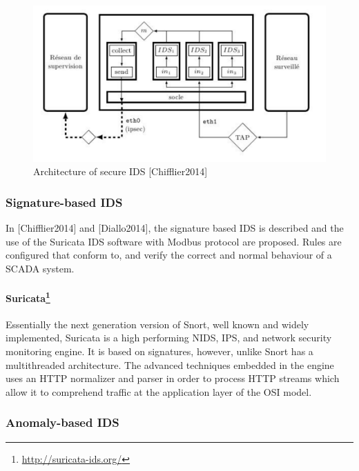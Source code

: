 \documentclass[12pt,]{article}
\let\rmarkdownfootnote\footnote%
\def\footnote{\protect\rmarkdownfootnote}
\begin{document}
\begin{figure}

{\centering \includegraphics{thesis_files/figure-latex/unnamed-chunk-39-1} 

}

\caption{Architecture of secure IDS [Chifflier2014]}\label{fig:unnamed-chunk-39}
\end{figure}

\subsubsection{Signature-based IDS}\label{signature-based-ids}

In {[}Chifflier2014{]} and {[}Diallo2014{]}, the signature based IDS is
described and the use of the Suricata IDS software with Modbus protocol
are proposed. Rules are configured that conform to, and verify the
correct and normal behaviour of a SCADA system.

\paragraph[Suricata]{Suricata\footnote{\url{http://suricata-ids.org/}}}\label{suricata7}

Essentially the next generation version of Snort, well known and widely
implemented, Suricata is a high performing NIDS, IPS, and network
security monitoring engine. It is based on signatures, however, unlike
Snort has a multithreaded architecture. The advanced techniques embedded
in the engine uses an HTTP normalizer and parser in order to process
HTTP streams which allow it to comprehend traffic at the application
layer of the OSI model.

\subsubsection{Anomaly-based IDS}\label{anomaly-based-ids}
\end{document}
